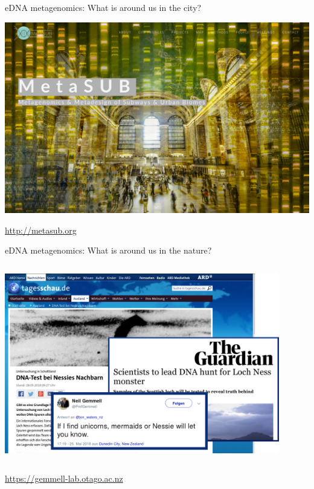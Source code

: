 \documentclass[10pt]{beamer}
\begin{document}
\begin{frame}{eDNA metagenomics: What is around us in the city?}
	\begin{center}
		\includegraphics[width=\textwidth]{./figures/metasub.png} \\
	\end{center}
	\url{http://metasub.org}
\end{frame}

\begin{frame}{eDNA metagenomics: What is around us in the nature?}
	\begin{columns}
		\column{\dimexpr\paperwidth-10pt}
		\begin{center}
			\includegraphics[width=0.9\textwidth]{./figures/tagesschau-nessie.png}\par
		\end{center}
	\end{columns}
	\url{https://gemmell-lab.otago.ac.nz}
\end{frame}
\end{document}
